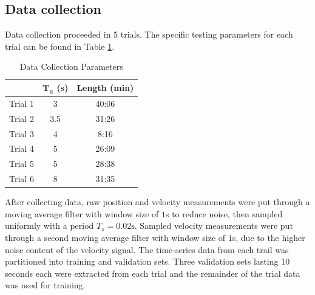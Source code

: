 
\subsection{Data collection}

Data collection proceeded in 5 trials. The specific testing parameters for each trial can be found in Table \ref{tab:trialParams}.

\begin{table}[h]
    \centering
    \caption{Data Collection Parameters}
    \begin{tabular}{|c||c|c|}
        \hline
         & $\bm{T_u}$ \textbf{(s)} & \textbf{Length (min)} \\
        \hline
         Trial 1 & 3 & 40:06 \\
         Trial 2 & 3.5 & 31:26 \\
         Trial 3 & 4 & 8:16 \\
         Trial 4 & 5 & 26:09 \\
         Trial 5 & 5 & 28:38 \\
         Trial 6 & 8 & 31:35 \\
        \hline
    \end{tabular}
    \label{tab:trialParams}
\end{table}

After collecting data, raw position and velocity measurements were put through a moving average filter with window size of $1$s to reduce noise, then sampled uniformly with a period $T_s = 0.02 \text{s}$.
Sampled velocity measurements were put through a second moving average filter with window size of $1$s, due to the higher noise content of the velocity signal.
The time-series data from each trail was partitioned into training and validation sets. 
Three validation sets lasting 10 seconds each were extracted from each trial and the remainder of the trial data was used for training.

